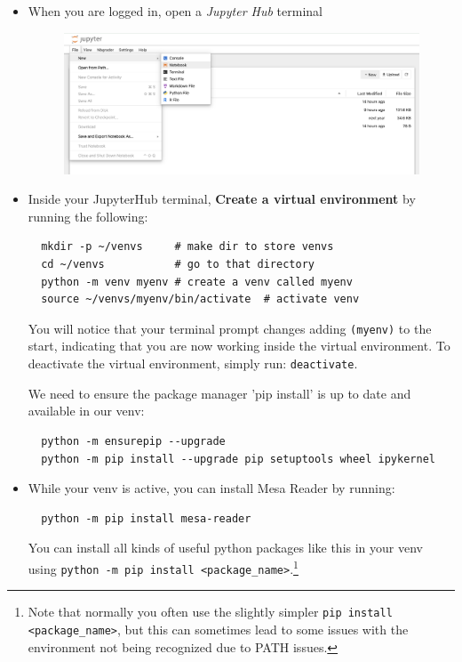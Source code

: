 \documentclass[11pt,a4paper]{article}
\begin{document}
\begin{itemize}

  \item When you are logged in, open a \textit{Jupyter Hub} terminal

\begin{figure}[h] %
    \centering
    \includegraphics[width=\textwidth]{open_jupyternotebook.png} %
    \caption*{ }
    \label{fig:myplot}
\end{figure}

  \item Inside your JupyterHub terminal, \textbf{Create a virtual environment} by running the following:
  \begin{lstlisting}
  mkdir -p ~/venvs     # make dir to store venvs
  cd ~/venvs           # go to that directory
  python -m venv myenv # create a venv called myenv
  source ~/venvs/myenv/bin/activate  # activate venv
  \end{lstlisting}

  You will notice that your terminal prompt changes adding \texttt{(myenv)} to the start, indicating that you are now working inside the virtual environment. To deactivate the virtual environment, simply run: \texttt{deactivate}.

  We need to ensure the package manager 'pip install' is up to date and available in our venv: 
  \begin{lstlisting}
  python -m ensurepip --upgrade
  python -m pip install --upgrade pip setuptools wheel ipykernel
  \end{lstlisting}


  \item While your venv is active, you can install Mesa Reader by running:
\begin{lstlisting}
  python -m pip install mesa-reader
\end{lstlisting}

    You can install all kinds of useful python packages like this in your venv using \texttt{python -m pip install <package\_name>}.\footnote{Note that normally you often use the slightly simpler \texttt{pip install <package\_name>}, but this can sometimes lead to some issues with the environment not being recognized due to PATH issues.}


\end{itemize}
\end{document}
